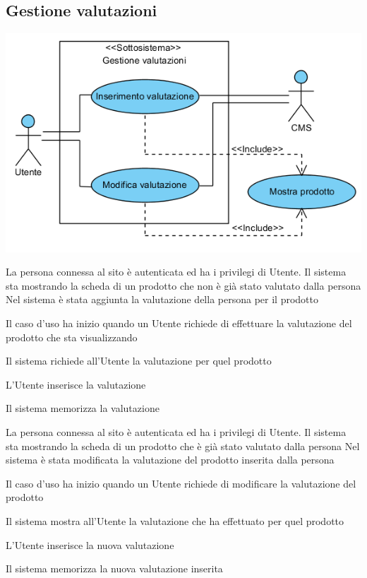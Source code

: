 \subsection{Gestione valutazioni}
\begin{center}
   \includegraphics[width=\textwidth]{assets/visualParadigm/cu/GestioneValutazioni}
\end{center}
{}
{La persona connessa al sito è autenticata ed ha i privilegi di Utente. Il sistema sta mostrando la scheda di un prodotto che non è già stato valutato dalla persona}
{Nel sistema è stata aggiunta la valutazione della persona per il prodotto}
{\begin{enumCU}
	\item Il caso d'uso ha inizio quando un Utente richiede di effettuare la valutazione del prodotto che sta visualizzando
	\item Il sistema richiede all'Utente la valutazione per quel prodotto
	\item L'Utente inserisce la valutazione
	\item Il sistema memorizza la valutazione
\end{enumCU}
}



{}
{La persona connessa al sito è autenticata ed ha i privilegi di Utente. Il sistema sta mostrando la scheda di un prodotto che è già stato valutato dalla persona}
{Nel sistema è stata modificata la valutazione del prodotto inserita dalla persona}
{\begin{enumCU}
	\item Il caso d'uso ha inizio quando un Utente richiede di modificare la valutazione del prodotto
	\item Il sistema mostra all'Utente la valutazione che ha effettuato per quel prodotto
	\item L'Utente inserisce la nuova valutazione
	\item Il sistema memorizza la nuova valutazione inserita
\end{enumCU}}

